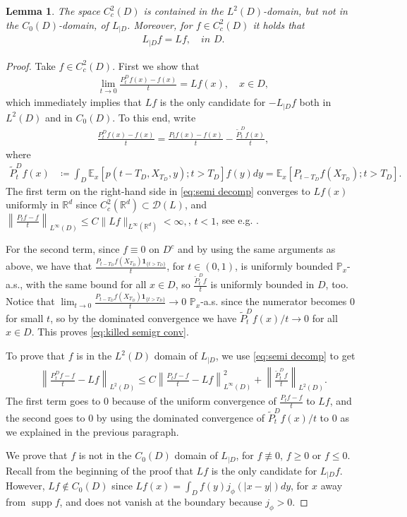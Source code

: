 \documentclass[12pt,a4paper,onecolumn]{article}
\DeclareMathOperator\supp{supp}
\newtheorem{lem}[thm]{Lemma}
\theoremstyle{definition}
\newcommand{\R}{\mathbb{R}}
\newcommand{\p}{\mathds{P}}
\newcommand{\ex}{\mathds{E}}
\newcommand{\1}{\mathbf 1}
\newcommand{\wt}{\widetilde}
\newcommand{\DD}{\mathcal{D}}
\newcommand{\Lbase}{L_{|D}}
\numberwithin{equation}{section}
\begin{document}
 	\begin{lem}\label{ap:l:generator domain}
		 The space $C_c^2(D)$ is contained in the $L^2(D)$-domain, but not in the $C_0(D)$-domain, of $\Lbase$. Moreover, for $f\in C_c^2(D)$ it holds that
		\begin{align*}
			\Lbase f=L f,\quad \textit{in $D$}.
		\end{align*}
	\end{lem}
	\begin{proof}
		Take $f\in C_c^2(D)$. First we show that 
		\begin{align}\label{eq:killed semigr conv}
			\lim_{t\to0}\frac{P^D_tf(x)-f(x)}{t}=L f(x),\quad x\in D,
		\end{align}
		which immediately implies that $L f$ is the only candidate for $-\Lbase f$ both in $L^2(D)$ and in $C_0(D)$. To this end, write
		\begin{align}\label{eq:semi decomp}
			\frac{P^D_tf(x)-f(x)}{t}=\frac{P_tf(x)-f(x)}{t}-\frac{\wt P^D_tf(x)}{t},
		\end{align}
		where
		\begin{align*}
			\wt P^D_tf(x)&\coloneqq \int_D \ex_x\left[p(t-T_D,X_{T_D},y);t>T_D\right]f(y)dy=\ex_x\left[P_{t-T_D}f(X_{T_D});t>T_D\right].
		\end{align*}
		The first term on the right-hand side in \eqref{eq:semi decomp} converges to $L f(x)$ uniformly in $\R^d$ since $C_c^2(\R^d)\subset\DD(L)$, and 
		$\left\|\frac{P_tf-f}{t}\right\|_{L^\infty(D)}\le C \|L f\|_{L^\infty(\R^d)}<\infty,$, $t<1$, see e.g. \cite[Eq. (13.3)]{bernstein}.
		
		For the second term, since $f\equiv 0$ on $D^c$ and by using the same arguments as above, we have that $\frac{P_{t-T_D}f(X_{T_D})\1_{\{t>T_D\}}}{t}$, for $t\in(0,1)$, is uniformly bounded $\p_x$-a.s.,  with the same bound for all $x\in D$, so $\frac{\wt P^D_tf}{t}$ is uniformly bounded in $D$, too. Notice that $\lim_{t\to0}\frac{P_{t-T_D}f(X_{T_D})\1_{\{t>T_D\}}}{t}\to 0$  $\p_x$-a.s. since the numerator becomes 0 for small $t$, so by the dominated convergence we have $\wt P^D_tf(x)/t\to0$ for all $x\in D$. This proves \eqref{eq:killed semigr conv}.
		
		To prove that $f$ is in the $L^2(D)$ domain of $\Lbase$, we use \eqref{eq:semi decomp} to get
		\begin{align*}
				\left\|\frac{P^D_tf-f}{t}-L f\right\|_{L^2(D)}\le 	C\left\|\frac{P_tf-f}{t}-L f\right\|^2_{L^\infty(D)}+\left\|\frac{\wt P^D_t f}{t}\right\|_{L^2(D)}.
		\end{align*}
		The first term goes to 0 because of the uniform convergence of $\frac{P_tf-f}{t}$ to $L f$, and the second goes to 0 by using the dominated convergence of $\wt P^D_tf(x)/t$ to 0 as we explained in the previous paragraph.
		
		We prove that  $f$ is not in the $C_0(D)$ domain of $\Lbase$, for $f\not\equiv0$, $f\ge0$ or $f\le0$. Recall from the beginning of the proof that $L f$ is the only candidate for $\Lbase f$. However, $L f\not\in C_0(D)$ since $L f(x)=\int_{D}f(y)j_\phi(|x-y|)dy$, for $x$ away from $\supp f$, and does not vanish at the boundary because $j_\phi>0$.
	\end{proof}
\end{document}
